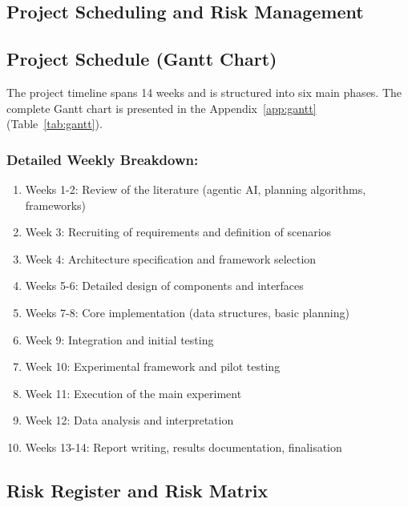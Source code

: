 \documentclass[12pt]{article}
\begin{document}
\subsection{Project Scheduling and Risk Management}
\label{proj_sched_risk_mgt}
\subsection{Project Schedule (Gantt Chart)}
The project timeline spans 14 weeks and is structured into six main phases.
The complete Gantt chart is presented in the Appendix~\ref{app:gantt} (Table~\ref{tab:gantt}).


\subsubsection{Detailed Weekly Breakdown:}
\begin{enumerate}
    \item Weeks 1-2: Review of the literature (agentic AI, planning algorithms, frameworks)
    \item Week 3: Recruiting of requirements and definition of scenarios
    \item Week 4: Architecture specification and framework selection
    \item Weeks 5-6: Detailed design of components and interfaces
    \item Weeks 7-8: Core implementation (data structures, basic planning)
    \item Week 9: Integration and initial testing
    \item Week 10: Experimental framework and pilot testing
    \item Week 11: Execution of the main experiment
    \item Week 12: Data analysis and interpretation
    \item Weeks 13-14: Report writing, results documentation, finalisation
\end{enumerate}
\subsection{Risk Register and Risk Matrix}
\end{document}
